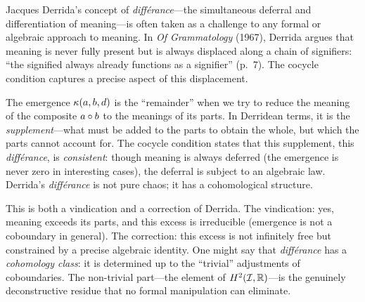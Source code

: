 \begin{interpretation}\label{interp:ch2:derrida_differance}
Jacques Derrida's concept of \emph{diff\'erance}---the simultaneous deferral
and differentiation of meaning---is often taken as a challenge to any
formal or algebraic approach to meaning. In \emph{Of Grammatology} (1967),
Derrida argues that meaning is never fully present but is always displaced
along a chain of signifiers: ``the signified always already functions as a
signifier'' (p.~7). The cocycle condition captures a precise aspect of
this displacement.

The emergence $\kappa(a, b, d)$ is the ``remainder'' when we try to
reduce the meaning of the composite $a \circ b$ to the meanings of its
parts. In Derridean terms, it is the \emph{supplement}---what must be added
to the parts to obtain the whole, but which the parts cannot account for.
The cocycle condition states that this supplement, this \emph{diff\'erance},
is \emph{consistent}: though meaning is always deferred (the emergence is
never zero in interesting cases), the deferral is subject to an algebraic
law. Derrida's \emph{diff\'erance} is not pure chaos; it has a cohomological
structure.

This is both a vindication and a correction of Derrida. The vindication: yes,
meaning exceeds its parts, and this excess is irreducible (emergence is not
a coboundary in general). The correction: this excess is not infinitely
free but constrained by a precise algebraic identity. One might say that
\emph{diff\'erance} has a \emph{cohomology class}: it is determined up to
the ``trivial'' adjustments of coboundaries. The non-trivial part---the
element of $H^2(\mathcal{I}, \mathbb{R})$---is the genuinely deconstructive residue that
no formal manipulation can eliminate.
\end{interpretation}

